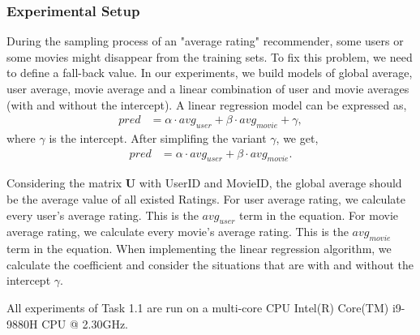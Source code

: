 \documentclass{article}
\begin{document}
\subsubsection{Experimental Setup}
During the sampling process of an "average rating" recommender, some users or some movies might disappear from the training sets. To fix this problem, we need to define a fall-back value. In our experiments, we build models of global average, user average, movie average and a linear combination of user and movie averages (with and without the intercept). A linear regression model can be expressed as,
\begin{align*}
    pred&=\alpha\cdot avg_{user} + \beta\cdot avg_{movie} + \gamma,
\end{align*}
where $\gamma$ is the intercept. After simplifing the variant $\gamma$, we get,
\begin{align*}
    pred&=\alpha\cdot avg_{user} + \beta\cdot avg_{movie}.
\end{align*}
\par
Considering the matrix $\mathbf{U}$ with UserID and MovieID, the global average should be the average value of all existed Ratings. For user average rating, we calculate every user's average rating. This is the $avg_{user}$ term in the equation. For movie average rating, we calculate every movie's average rating. This is the $avg_{movie}$ term in the equation. When implementing the linear regression algorithm, we calculate the coefficient and consider the situations that are with and without the intercept $\gamma$.\par
All experiments of Task 1.1 are run on a multi-core CPU Intel(R) Core(TM) i9-9880H CPU @ 2.30GHz.
\end{document}
